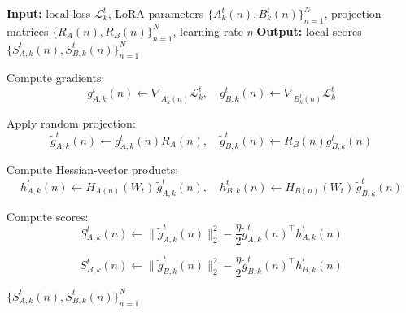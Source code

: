 \begin{algorithm}[h]
\caption{Score Computation $\mathcal{S}_{\mathrm{HVP}}(\cdot)$ with Random Projection}
\label{alg:score_hvp}
\begin{algorithmic}[1]

\STATE \textbf{Input:} local loss $\mathcal{L}_k^t$, LoRA parameters $\{A_k^t(n), B_k^t(n)\}_{n=1}^{N}$, projection matrices $\{R_A(n), R_B(n)\}_{n=1}^{N}$, learning rate $\eta$
\STATE \textbf{Output:} local scores $\{S_{A,k}^t(n), S_{B,k}^t(n)\}_{n=1}^{N}$


    \STATE Compute gradients:
    \[
    g_{A,k}^t(n) \leftarrow \nabla_{A_k^t(n)} \mathcal{L}_k^t,
    \quad
    g_{B,k}^t(n) \leftarrow \nabla_{B_k^t(n)} \mathcal{L}_k^t
    \]

    \STATE Apply random projection:
    \[
    \widetilde{g}_{A,k}^t(n) \leftarrow g_{A,k}^t(n) R_A(n),
    \quad
    \widetilde{g}_{B,k}^t(n) \leftarrow R_B(n) g_{B,k}^t(n)
    \]

    \STATE Compute Hessian-vector products:
    \[
    h_{A,k}^t(n) \leftarrow H_{A(n)}(W_t)\,\widetilde{g}_{A,k}^t(n),
    \quad
    h_{B,k}^t(n) \leftarrow H_{B(n)}(W_t)\,\widetilde{g}_{B,k}^t(n)
    \]

    \STATE Compute scores:
    \[
    S_{A,k}^t(n) \leftarrow 
    \|\widetilde{g}_{A,k}^t(n)\|_2^2
    -
    \frac{\eta}{2}
    \widetilde{g}_{A,k}^t(n)^\top h_{A,k}^t(n)
    \]

    \[
    S_{B,k}^t(n) \leftarrow 
    \|\widetilde{g}_{B,k}^t(n)\|_2^2
    -
    \frac{\eta}{2}
    \widetilde{g}_{B,k}^t(n)^\top h_{B,k}^t(n)
    \]

\ENDFOR

\RETURN $\{S_{A,k}^t(n), S_{B,k}^t(n)\}_{n=1}^{N}$

\end{algorithmic}
\end{algorithm}

